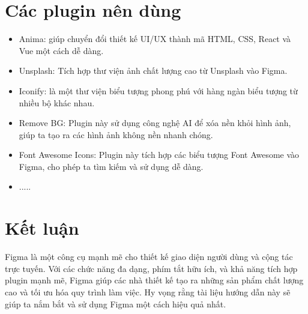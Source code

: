 \documentclass[11pt]{article}
\begin{document}
\section{Các plugin nên dùng}
\begin{itemize}
    \item Anima: giúp chuyển đổi thiết kế UI/UX thành mã HTML, CSS, React và Vue một cách dễ dàng.
    \item Unsplash: Tích hợp thư viện ảnh chất lượng cao từ Unsplash vào Figma.
    \item Iconify: là một thư viện biểu tượng phong phú với hàng ngàn biểu tượng từ nhiều bộ khác nhau.
    \item Remove BG: Plugin này sử dụng công nghệ AI để xóa nền khỏi hình ảnh, giúp ta tạo ra các hình ảnh không nền nhanh chóng.
    \item Font Awesome Icons: Plugin này tích hợp các biểu tượng Font Awesome vào Figma, cho phép ta tìm kiếm và sử dụng dễ dàng.
    \item .....
\end{itemize}


\section{Kết luận}
Figma là một công cụ mạnh mẽ cho thiết kế giao diện người dùng và cộng tác trực tuyến. Với các chức năng đa dạng, phím tắt hữu ích, và khả năng tích hợp plugin mạnh mẽ, Figma giúp các nhà thiết kế tạo ra những sản phẩm chất lượng cao và tối ưu hóa quy trình làm việc. Hy vọng rằng tài liệu hướng dẫn này sẽ giúp ta nắm bắt và sử dụng Figma một cách hiệu quả nhất.




\end{document}

